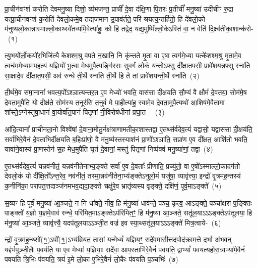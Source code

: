 \setcounter{anuvakam}{0}
प्रा॒चीन॑वꣳशं करोति देवमनु॒ष्या दिशो॒ व्य॑भजन्त॒ प्राचीं᳚ दे॒वा द॑क्षि॒णा पि॒तरः॑ प्र॒तीचीं᳚ मनु॒ष्या॑ उदी॑चीꣳ रु॒द्रा यत्प्रा॒चीन॑वꣳशं क॒रोति॑ देवलो॒कमे॒व तद्यज॑मान उ॒पाव॑र्तते॒ परि॑ श्रयत्य॒न्तर्\mbox{}हि॑तो॒ हि दे॑वलो॒को म॑नुष्यलो॒का\-न्नास्माल्लो॒काथ्स्वे॑तव्यमि॒वेत्या॑हुः॒ को हि तद्वेद॒ यद्य॒मुष्मिँ॑ल्लो॒के\-ऽस्ति॑ वा॒ न वेति॑ दि॒क्ष्व॑तीका॒शान्क॑रो-~(१)\ip

त्यु॒भयो᳚र्लो॒कयो॑र॒भिजि॑त्यै केशश्म॒श्रु व॑पते न॒खानि॒ नि कृ॑न्तते मृ॒ता वा ए॒षा त्वग॑मे॒ध्या यत्के॑शश्म॒श्रु मृ॒तामे॒व त्वच॑ममे॒ध्याम॑प॒हत्य॑ य॒ज्ञियो॑ भू॒त्वा मेध॒मुपै॒त्यङ्गि॑रसः सुव॒र्गं लो॒कं यन्तो॒\-ऽफ्सु दी᳚क्षात॒पसी॒ प्रावे॑शयन्न॒फ्सु स्ना॑ति सा॒क्षादे॒व दी᳚क्षात॒पसी॒ अव॑ रुन्धे ती॒र्थे स्ना॑ति ती॒र्थे हि ते तां प्रावे॑शयन्ती॒र्थे स्ना॑ति~(२)\ip

ती॒र्थमे॒व स॑मा॒नानां᳚ भवत्य॒पो᳚\-ऽश्ञात्यन्तर॒त ए॒व मेध्यो॑ भवति॒ वास॑सा दीक्षयति सौ॒म्यं वै क्षौमं॑ दे॒वत॑या॒ सोम॑मे॒ष दे॒वता॒मुपै॑ति॒ यो दीक्ष॑ते॒ सोम॑स्य त॒नूर॑सि त॒नुवं॑ मे पा॒हीत्या॑ह॒ स्वामे॒व दे॒वता॒मुपै॒त्यथो॑ आ॒शिष॑मे॒वैतामा शा᳚स्ते॒\-ऽग्नेस्तू॑षा॒धानं॑ वा॒योर्वा॑त॒पानं॑ पितृ॒णां नी॒विरोष॑धीनां प्रघा॒त~-~(३)\ip

आ॑दि॒त्यानां᳚ प्राचीनता॒नो विश्वे॑षां दे॒वाना॒मोतु॒र्नक्ष॑त्राणामतीका॒शास्तद्वा ए॒तथ्स॑र्वदेव॒त्यं॑ यद्वासो॒ यद्वास॑सा दी॒क्षय॑ति॒ सर्वा॑भिरे॒वैनं॑ दे॒वता॑भिर्दीक्षयति ब॒हिःप्रा॑णो॒ वै म॑नु॒ष्य॑स्तस्याश॑नं प्रा॒णो᳚\-ऽश्ञाति॒ सप्रा॑ण ए॒व दी᳚क्षत॒ आशि॑तो भवति॒ यावा॑ने॒वास्य॑ प्रा॒णस्तेन॑ स॒ह मेध॒मुपै॑ति घृ॒तं दे॒वानां॒ मस्तु॑ पितृ॒णां निष्प॑क्वं मनु॒ष्या॑णां॒ तद्वा~(४)\ip

ए॒तथ्स॑र्वदेव॒त्यं॑ यन्नव॑नीतं॒ यन्नव॑नीतेनाभ्य॒ङ्क्ते सर्वा॑ ए॒व दे॒वताः᳚ प्रीणाति॒ प्रच्यु॑तो॒ वा ए॒षो᳚\-ऽस्माल्लो॒कादग॑तो देवलो॒कं यो दी᳚क्षि॒तो᳚\-ऽन्त॒रेव॒ नव॑नीतं॒ तस्मा॒न्नव॑नीतेना॒भ्य॑ङ्क्ते\-ऽनुलो॒मं यजु॑षा॒ व्यावृ॑त्त्या॒ इन्द्रो॑ वृ॒त्रम॑ह॒न्तस्य॑ क॒नीनि॑का॒ परा॑पत॒त्तदाञ्ज॑नमभव॒द्यदा॒ङ्क्ते चक्षु॑रे॒व भ्रातृ॑व्यस्य वृङ्क्ते॒ दक्षि॑णं॒ पूर्व॒माऽङ्क्ते॑~(५)\ip

स॒व्यꣳ हि पूर्वं॑ मनु॒ष्या॑ आ॒ञ्जते॒ न नि धा॑वते॒ नीव॒ हि म॑नु॒ष्या॑ धाव॑न्ते॒ पञ्च॒ कृत्व॒ आऽङ्क्ते॒ पञ्चा᳚क्षरा प॒ङ्क्तिः पाङ्क्तो॑ य॒ज्ञो य॒ज्ञमे॒वाव॑ रुन्धे॒ परि॑मित॒माऽङ्क्ते\-ऽप॑रिमित॒ꣳ॒ हि म॑नु॒ष्या॑ आ॒ञ्जते॒ सतू॑ल॒या\-ऽऽ\-ऽङ्क्ते\-ऽप॑तूलया॒ हि म॑नु॒ष्या॑ आ॒ञ्जते॒ व्यावृ॑त्त्यै॒ यदप॑तूलया\-ऽऽञ्जी॒त वज्र॑ इव स्या॒थ्सतू॑ल॒या\-ऽऽ\-ऽङ्क्ते॑ मित्र॒त्वाये-~(६)\ip

न्द्रो॑ वृ॒त्रम॑ह॒न्थ्सो᳚\-(१॒)ऽपो᳚\-(१॒)ऽभ्य॑म्रियत॒ तासां॒ यन्मेध्यं॑ य॒ज्ञिय॒ꣳ॒ सदे॑व॒मासी॒त्तदपोद॑\-क्राम॒त्ते द॒र्भा अ॑भव॒न्॒ यद्द॑र्भपुञ्जी॒लैः प॒वय॑ति॒ या ए॒व मेध्या॑ य॒ज्ञियाः॒ सदे॑वा॒ आप॒स्ताभि॑रे॒वैनं॑ पवयति॒ द्वा\-भ्यां᳚ पवयत्यहोरा॒त्राभ्या॑मे॒वैनं॑ पवयति त्रि॒भिः प॑वयति॒ त्रय॑ इ॒मे लो॒का ए॒भिरे॒वैनं॑ लो॒कैः प॑वयति प॒ञ्चभिः॑~(७)\ip

